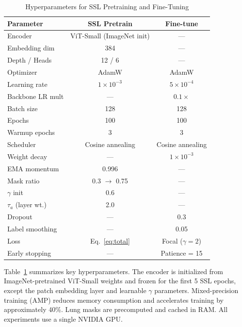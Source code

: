 \begin{table}[t]
\centering
\caption{Hyperparameters for SSL Pretraining and Fine-Tuning}
\label{tab:hyperparams}
\begin{tabular}{@{}lcc@{}}
\toprule
\textbf{Parameter} & \textbf{SSL Pretrain} & \textbf{Fine-tune} \\
\midrule
Encoder           & ViT-Small (ImageNet init) & --- \\
Embedding dim     & 384                 & --- \\
Depth / Heads     & 12 / 6              & --- \\
Optimizer         & AdamW               & AdamW \\
Learning rate     & $1 \times 10^{-3}$  & $5 \times 10^{-4}$ \\
Backbone LR mult  & ---                 & $0.1\times$ \\
Batch size        & 128                 & 128 \\
Epochs            & 100                 & 100 \\
Warmup epochs     & 3                   & 3 \\
Scheduler         & Cosine annealing    & Cosine annealing \\
Weight decay      & ---                 & $1 \times 10^{-3}$ \\
EMA momentum      & 0.996               & --- \\
Mask ratio        & 0.3 $\to$ 0.75      & --- \\
$\gamma$ init     & 0.6                 & --- \\
$\tau_a$ (layer wt.) & 2.0              & --- \\
Dropout           & ---                 & 0.3 \\
Label smoothing   & ---                 & 0.05 \\
Loss              & Eq.~\eqref{eq:total}& Focal ($\gamma{=}2$) \\
Early stopping    & ---                 & Patience = 15 \\
\bottomrule
\end{tabular}
\end{table}

Table~\ref{tab:hyperparams} summarizes key hyperparameters. The encoder is initialized from ImageNet-pretrained ViT-Small weights and frozen for the first 5 SSL epochs, except the patch embedding layer and learnable $\gamma$ parameters. Mixed-precision training (AMP) reduces memory consumption and accelerates training by approximately 40\%. Lung masks are precomputed and cached in RAM. All experiments use a single NVIDIA GPU.

